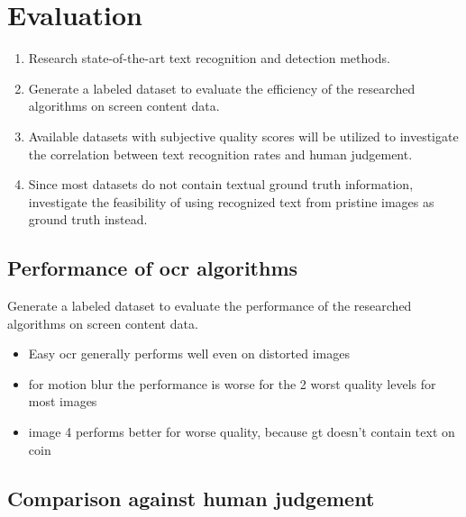 \chapter{Evaluation}
\label{chap:evaluation}

\begin{enumerate}
\item Research state-of-the-art text recognition and detection methods.

\item Generate a labeled dataset to evaluate the efficiency of the researched algorithms
   on screen content data.

\item Available datasets with subjective quality scores will be utilized to investigate
   the correlation between text recognition rates and human judgement.

\item Since most datasets do not contain textual ground truth information,
   investigate the feasibility of using recognized text from pristine images as ground truth instead.

\end{enumerate}

\section{Performance of ocr algorithms}
\label{sec:ocr_performance}

Generate a labeled dataset to evaluate the performance of the researched algorithms
on screen content data.

\begin{itemize}
\item Easy ocr generally performs well even on distorted images
\item for motion blur the performance is worse for the 2 worst quality levels for most images
\item image 4 performs better for worse quality, because gt doesn't contain text on coin
\end{itemize}


\section{Comparison against human judgement}
\label{sec:comparison_against_human_judgement}

